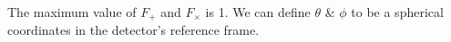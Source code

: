 \documentclass{ttuthes2007}
\begin{document}
The maximum value of $F_+$ and $F_\times$ is 1. We can define $\theta$ \&
$\phi$ to be a spherical coordinates in the detector's reference frame. 
%
%
\end{document}
